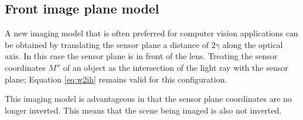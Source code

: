 \documentclass[12pt,oneside,openany,a4paper, %
english, %
masters-t, goldenblock]{usthesis}
\begin{document}
\subsection{Front image plane model}
A new imaging model that is often preferred for computer vision applications can be obtained by translating the sensor plane a distance of $2\gamma$ along the optical axis. In this case the sensor plane is in front of the lens. Treating the sensor coordinates $M''$ of an object as the intersection of the light ray with the sensor plane; Equation \ref{eq:w2ih} remains valid for this configuration.

This imaging model is advantageous in that the sensor plane coordinates are no longer inverted. This means that the scene being imaged is also not inverted.





\end{document}
